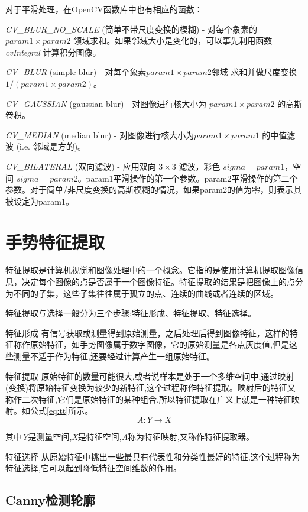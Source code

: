 \documentclass{XDBAthesis}
\begin{document}
对于平滑处理，在OpenCV函数库中也有相应的函数：

\emph{CV\_BLUR\_NO\_SCALE} (简单不带尺度变换的模糊) - 对每个象素的 $param1\times param2$ 领域求和。如果邻域大小是变化的，可以事先利用函数 \emph{cvIntegral} 计算积分图像。

\emph{CV\_BLUR} (simple blur) - 对每个象素$param1\times param2$邻域 求和并做尺度变换 $1/(param1\times param2)$。

\emph{CV\_GAUSSIAN} (gaussian blur) - 对图像进行核大小为 $param1\times param2$ 的高斯卷积。

\emph{CV\_MEDIAN} (median blur) - 对图像进行核大小为$param1\times param1$ 的中值滤波 (i.e. 邻域是方的)。

\emph{CV\_BILATERAL} (双向滤波) - 应用双向 $3\times 3$ 滤波，彩色 $sigma=param1$，空间 $sigma=param2$。param1平滑操作的第一个参数。param2平滑操作的第二个参数。对于简单/非尺度变换的高斯模糊的情况，如果param2的值为零，则表示其被设定为param1。

\section{手势特征提取}

    特征提取是计算机视觉和图像处理中的一个概念。它指的是使用计算机提取图像信息，决定每个图像的点是否属于一个图像特征。特征提取的结果是把图像上的点分为不同的子集，这些子集往往属于孤立的点、连续的曲线或者连续的区域。

特征提取与选择一般分为三个步骤:特征形成、特征提取、特征选择。

特征形成  有信号获取或测量得到原始测量，之后处理后得到图像特征，这样的特征称作原始特征，如手势图像属于数字图像，它的原始测量是各点灰度值,但是这些测量不适于作为特征,还要经过计算产生一组原始特征。

     特征提取  原始特征的数量可能很大,或者说样本是处于一个多维空间中,通过映射(变换)将原始特征变换为较少的新特征,这个过程称作特征提取。映射后的特征又称作二次特征,它们是原始特征的某种组合,所以特征提取在广义上就是一种特征映射。如公式\eqref{eq:tt}所示。
\begin{equation}
    A:Y\rightarrow X
    \label{eq:tt}
\end{equation}

其中\emph{Y}是测量空间,\emph{X}是特征空间,\emph{A}称为特征映射,又称作特征提取器。

     特征选择  从原始特征中挑出一些最具有代表性和分类性最好的特征,这个过程称为特征选择,它可以起到降低特征空间维数的作用。

\subsection{Canny检测轮廓}
\end{document}
